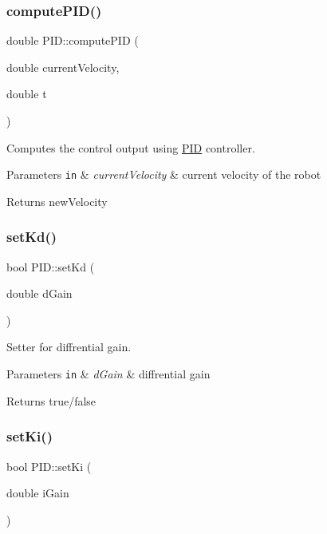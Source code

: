 \subsubsection{\texorpdfstring{compute\+P\+I\+D()}{computePID()}}
{\footnotesize\ttfamily double P\+I\+D\+::compute\+P\+ID (\begin{DoxyParamCaption}\item[{double}]{current\+Velocity,  }\item[{double}]{t }\end{DoxyParamCaption})}



Computes the control output using \hyperlink{classPID}{P\+ID} controller. 


\begin{DoxyParams}[1]{Parameters}
\mbox{\tt in}  & {\em current\+Velocity} & current velocity of the robot \\
\hline
\end{DoxyParams}
\begin{DoxyReturn}{Returns}
new\+Velocity 
\end{DoxyReturn}
\mbox{\label{classPID_a91359adee27385a381690ae548afe976}} 
\subsubsection{\texorpdfstring{set\+Kd()}{setKd()}}
{\footnotesize\ttfamily bool P\+I\+D\+::set\+Kd (\begin{DoxyParamCaption}\item[{double}]{d\+Gain }\end{DoxyParamCaption})}



Setter for diffrential gain. 


\begin{DoxyParams}[1]{Parameters}
\mbox{\tt in}  & {\em d\+Gain} & diffrential gain \\
\hline
\end{DoxyParams}
\begin{DoxyReturn}{Returns}
true/false 
\end{DoxyReturn}
\mbox{\label{classPID_af0d5d19e1657530e1cbca6ed675629e0}} 
\subsubsection{\texorpdfstring{set\+Ki()}{setKi()}}
{\footnotesize\ttfamily bool P\+I\+D\+::set\+Ki (\begin{DoxyParamCaption}\item[{double}]{i\+Gain }\end{DoxyParamCaption})}



